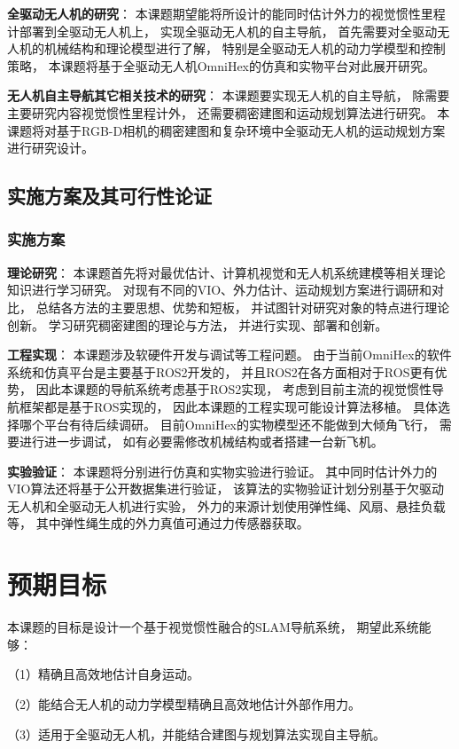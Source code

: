 \textbf{全驱动无人机的研究}：
本课题期望能将所设计的能同时估计外力的视觉惯性里程计部署到全驱动无人机上，
实现全驱动无人机的自主导航，
首先需要对全驱动无人机的机械结构和理论模型进行了解，
特别是全驱动无人机的动力学模型和控制策略，
本课题将基于全驱动无人机OmniHex的仿真和实物平台对此展开研究。

\textbf{无人机自主导航其它相关技术的研究}：
本课题要实现无人机的自主导航，
除需要主要研究内容视觉惯性里程计外，
还需要稠密建图和运动规划算法进行研究。
本课题将对基于RGB-D相机的稠密建图和复杂环境中全驱动无人机的运动规划方案进行研究设计。

\subsection{实施方案及其可行性论证}
\subsubsection{实施方案}
\textbf{理论研究}：
本课题首先将对最优估计、计算机视觉和无人机系统建模等相关理论知识进行学习研究。
对现有不同的VIO、外力估计、运动规划方案进行调研和对比，
总结各方法的主要思想、优势和短板，
并试图针对研究对象的特点进行理论创新。
学习研究稠密建图的理论与方法，
并进行实现、部署和创新。

\textbf{工程实现}：
本课题涉及软硬件开发与调试等工程问题。
由于当前OmniHex的软件系统和仿真平台是主要基于ROS2开发的，
并且ROS2在各方面相对于ROS更有优势，
因此本课题的导航系统考虑基于ROS2实现，
考虑到目前主流的视觉惯性导航框架都是基于ROS实现的，
因此本课题的工程实现可能设计算法移植。
具体选择哪个平台有待后续调研。
目前OmniHex的实物模型还不能做到大倾角飞行，
需要进行进一步调试，
如有必要需修改机械结构或者搭建一台新飞机。

\textbf{实验验证}：
本课题将分别进行仿真和实物实验进行验证。
其中同时估计外力的VIO算法还将基于公开数据集进行验证，
该算法的实物验证计划分别基于欠驱动无人机和全驱动无人机进行实验，
外力的来源计划使用弹性绳、风扇、悬挂负载等，
其中弹性绳生成的外力真值可通过力传感器获取。

\section{预期目标}
本课题的目标是设计一个基于视觉惯性融合的SLAM导航系统，
期望此系统能够：

（1）精确且高效地估计自身运动。

（2）能结合无人机的动力学模型精确且高效地估计外部作用力。
 
（3）适用于全驱动无人机，并能结合建图与规划算法实现自主导航。

